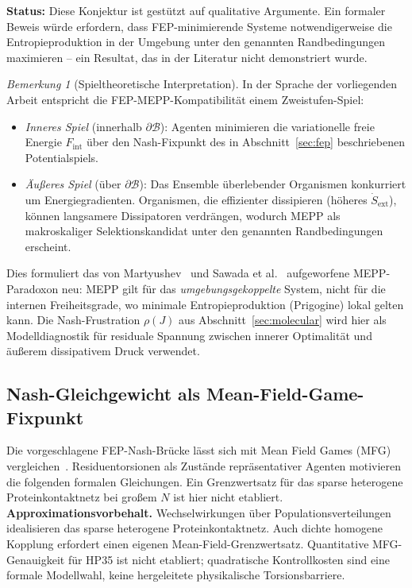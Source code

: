 \documentclass[12pt,a4paper]{article}
\theoremstyle{remark}
\newtheorem{remark}{Bemerkung}
\begin{document}
\noindent\textbf{Status:} Diese Konjektur ist gestützt auf qualitative Argumente. Ein formaler Beweis würde erfordern, dass FEP-minimierende Systeme notwendigerweise die Entropieproduktion in der Umgebung unter den genannten Randbedingungen maximieren -- ein Resultat, das in der Literatur nicht demonstriert wurde.

\begin{remark}[Spieltheoretische Interpretation]
In der Sprache der vorliegenden Arbeit entspricht die FEP-MEPP-Kompatibilität einem Zweistufen-Spiel:
\begin{itemize}
  \item \emph{Inneres Spiel} (innerhalb $\partial\mathcal{B}$): Agenten minimieren die variationelle freie Energie $F_{\mathrm{int}}$ über den Nash-Fixpunkt des in Abschnitt~\ref{sec:fep} beschriebenen Potentialspiels.
  \item \emph{Äußeres Spiel} (über $\partial\mathcal{B}$): Das Ensemble überlebender Organismen konkurriert um Energiegradienten. Organismen, die effizienter dissipieren (höheres $\dot{S}_{\mathrm{ext}}$), können langsamere Dissipatoren verdrängen, wodurch MEPP als makroskaliger Selektionskandidat unter den genannten Randbedingungen erscheint.
\end{itemize}
Dies formuliert das von Martyushev~\cite{Martyushev2010} und Sawada et al.~\citep{Toma2025} aufgeworfene MEPP-Paradoxon neu: MEPP gilt für das \emph{umgebungsgekoppelte} System, nicht für die internen Freiheitsgrade, wo minimale Entropieproduktion (Prigogine) lokal gelten kann. Die Nash-Frustration $\rho(J)$ aus Abschnitt~\ref{sec:molecular} wird hier als Modelldiagnostik für residuale Spannung zwischen innerer Optimalität und äußerem dissipativem Druck verwendet.
\end{remark}

\subsection{Nash-Gleichgewicht als Mean-Field-Game-Fixpunkt}\label{sec:mfg-fixpoint}


Die vorgeschlagene FEP-Nash-Brücke lässt sich mit Mean Field Games (MFG) vergleichen~\citep{LasryLions2007}. Residuentorsionen als Zustände repräsentativer Agenten motivieren die folgenden formalen Gleichungen. Ein Grenzwertsatz für das sparse heterogene Proteinkontaktnetz bei großem $N$ ist hier nicht etabliert.
\textbf{Approximationsvorbehalt.} Wechselwirkungen über Populationsverteilungen idealisieren das sparse heterogene Proteinkontaktnetz. Auch dichte homogene Kopplung erfordert einen eigenen Mean-Field-Grenzwertsatz. Quantitative MFG-Genauigkeit für HP35 ist nicht etabliert; quadratische Kontrollkosten sind eine formale Modellwahl, keine hergeleitete physikalische Torsionsbarriere.
\end{document}
